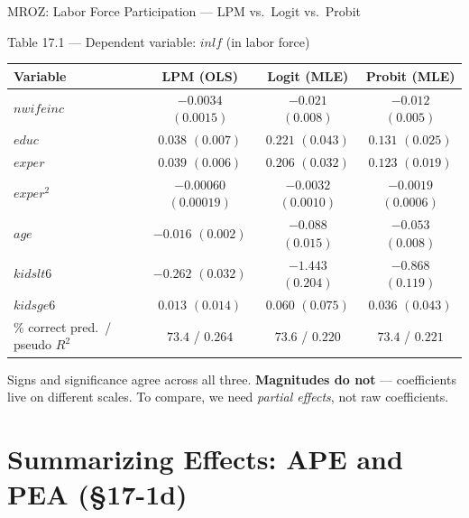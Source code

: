 \documentclass[aspectratio=169, 12pt]{beamer}
\begin{document}
\begin{frame}[shrink=10]{MROZ: Labor Force Participation --- LPM vs.\ Logit vs.\ Probit}

  \begin{examplebox}{Table 17.1 --- Dependent variable: $inlf$ (in labor force)}
    \centering\footnotesize
    \begin{tabular}{l c c c}
      \toprule
      Variable & LPM (OLS) & Logit (MLE) & Probit (MLE) \\
      \midrule
      $nwifeinc$ & $-0.0034$ $(0.0015)$ & $-0.021$ $(0.008)$ & $-0.012$ $(0.005)$ \\
      $educ$     & $0.038$ $(0.007)$    & $0.221$ $(0.043)$  & $0.131$ $(0.025)$  \\
      $exper$    & $0.039$ $(0.006)$    & $0.206$ $(0.032)$  & $0.123$ $(0.019)$  \\
      $exper^2$  & $-0.00060$ $(0.00019)$ & $-0.0032$ $(0.0010)$ & $-0.0019$ $(0.0006)$ \\
      $age$      & $-0.016$ $(0.002)$   & $-0.088$ $(0.015)$ & $-0.053$ $(0.008)$ \\
      $kidslt6$  & $-0.262$ $(0.032)$   & $-1.443$ $(0.204)$ & $-0.868$ $(0.119)$ \\
      $kidsge6$  & $0.013$ $(0.014)$    & $0.060$ $(0.075)$  & $0.036$ $(0.043)$ \\
      \midrule
      \% correct pred.\ / pseudo $R^2$ & $73.4$ / $0.264$ & $73.6$ / $0.220$ & $73.4$ / $0.221$ \\
      \bottomrule
    \end{tabular}
  \end{examplebox}

  \begin{keybox}
    \small
    Signs and significance agree across all three. \textbf{Magnitudes do not} ---
    coefficients live on different scales. To compare, we need \emph{partial
    effects}, not raw coefficients.
  \end{keybox}

\end{frame}

\section{Summarizing Effects: APE and PEA (\S17-1d)}
\end{document}
